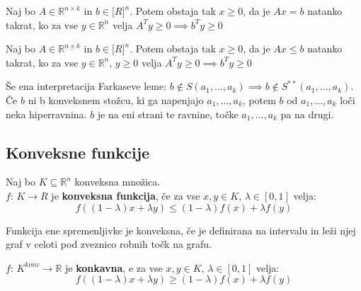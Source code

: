 \documentclass[11pt, a4paper]{article}
\begin{document}
    \begin{theorem}
        Naj bo \(A \in \mathbb{R}^{n \times k}\) in \(b \in \mathbb[R]^n\). Potem obstaja tak \(x \ge 0\), da je \(Ax = b\) natanko takrat, ko za vse \(y \in \mathbb{R}^n\) velja \(A^T y \ge 0 \implies b^T y \ge 0\)
    \end{theorem}

    \begin{theorem}
        Naj bo \(A \in \mathbb{R}^{n \times k}\) in \(b \in \mathbb[R]^n\). Potem obstaja tak \(x \ge 0\), da je \(Ax \le b\) natanko takrat, ko za vse \(y \in \mathbb{R}^n\), \(y \ge 0\) velja \(A^T y \ge 0 \implies b^T y \ge 0\)
    \end{theorem}

    \begin{remark}
        Še ena interpretacija Farkaseve leme: \(b \notin S(a_1,...,a_k) \implies b \notin S^{**}(a_1,...,a_k)\). \\
        Če \(b\) ni b konveksnem stožcu, ki ga napenjajo \(a_1,...,a_k\), potem \(b\) od \(a_1,...,a_k\) loči neka hiperravnina. \(b\) je na eni strani te ravnine, točke \(a_1,...,a_k\) pa na drugi.
    \end{remark}



    \subsection{Konveksne funkcije}

    \begin{definition}
        Naj bo \(K \subseteq \mathbb{R}^n\) konveksna množica. \\
        \(f\): \(K \to R\) je \textbf{konveksna funkcija}, če za vse \(x,y \in K\), \(\lambda \in [0,1]\) velja:
        \[
            f((1-\lambda) x + \lambda y) \le (1-\lambda) f(x) + \lambda f(y)
        \]
    \end{definition}

    \begin{remark}
        Funkcija ene spremenljivke je konveksna, če je definirana na intervalu in leži njej graf v celoti pod zveznico robnih točk na grafu.
    \end{remark}

    \begin{definition}
        \(f\): \(K^{konv} \to \mathbb{R}\) je \textbf{konkavna}, e za vse \(x,y \in K\), \(\lambda \in [0,1]\) velja:
        \[
            f((1-\lambda) x + \lambda y) \ge (1-\lambda) f(x) + \lambda f(y)
        \]
    \end{definition}
\end{document}
